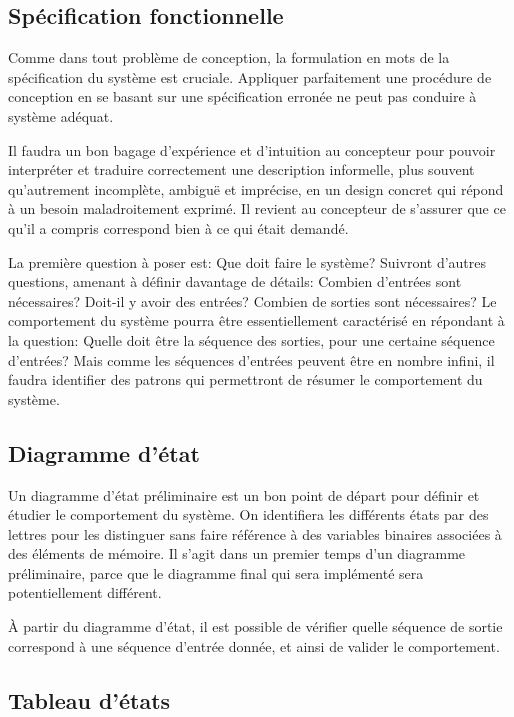 \documentclass[11pt]{article}
\begin{document}
\subsection{Spécification fonctionnelle}
\label{sec:orge251cbe}

Comme dans tout problème de conception, la formulation en mots de la
spécification du système est cruciale. Appliquer parfaitement une
procédure de conception en se basant sur une spécification erronée ne
peut pas conduire à système adéquat.

Il faudra un bon bagage d'expérience et d'intuition au concepteur pour
pouvoir interpréter et traduire correctement une description
informelle, plus souvent qu'autrement incomplète, ambiguë et
imprécise, en un design concret qui répond à un besoin maladroitement
exprimé. Il revient au concepteur de s'assurer que ce qu'il a compris
correspond bien à ce qui était demandé.

La première question à poser est: Que doit faire le système? Suivront
d'autres questions, amenant à définir davantage de détails: Combien
d'entrées sont nécessaires? Doit-il y avoir des entrées? Combien de
sorties sont nécessaires? Le comportement du système pourra être
essentiellement caractérisé en répondant à la question: Quelle doit
être la séquence des sorties, pour une certaine séquence d'entrées?
Mais comme les séquences d'entrées peuvent être en nombre infini, il
faudra identifier des patrons qui permettront de résumer le
comportement du système.

\subsection{Diagramme d'état}
\label{sec:orgc273752}

Un diagramme d'état préliminaire est un bon point de départ pour
définir et étudier le comportement du système. On identifiera les
différents états par des lettres pour les distinguer sans faire
référence à des variables binaires associées à des éléments de
mémoire. Il s'agit dans un premier temps d'un diagramme préliminaire,
parce que le diagramme final qui sera implémenté sera potentiellement
différent.

À partir du diagramme d'état, il est possible de vérifier quelle
séquence de sortie correspond à une séquence d'entrée donnée, et ainsi
de valider le comportement.

\subsection{Tableau d'états}
\label{sec:org5e7e865}
\end{document}
